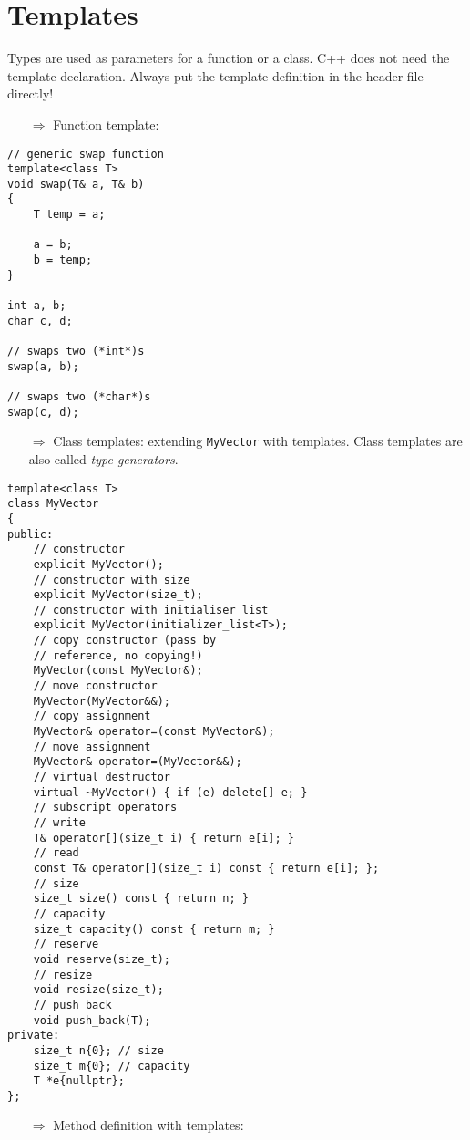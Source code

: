 \documentclass[10pt]{article}
\begin{document}
\section{Templates}
\small
Types are used as parameters for a function or a class.  C++ does not need the template declaration. Always put the 
template definition in the header file directly!
\begin{enumerate}
\item[$\Rightarrow$] Function template:
\end{enumerate}
\begin{lstlisting}
// generic swap function
template<class T>
void swap(T& a, T& b)
{
    T temp = a;
    
    a = b;
    b = temp;
}

int a, b;
char c, d;

// swaps two (*int*)s
swap(a, b);

// swaps two (*char*)s
swap(c, d);
\end{lstlisting}
\begin{enumerate}
\item[$\Rightarrow$] Class templates: extending \texttt{MyVector} with templates. Class templates are also called \emph{type generators}.
\end{enumerate}
\begin{lstlisting}
template<class T>
class MyVector
{
public:
    // constructor
    explicit MyVector();
    // constructor with size
    explicit MyVector(size_t);
    // constructor with initialiser list
    explicit MyVector(initializer_list<T>);
    // copy constructor (pass by
    // reference, no copying!)
    MyVector(const MyVector&);
    // move constructor
    MyVector(MyVector&&);
    // copy assignment
    MyVector& operator=(const MyVector&);
    // move assignment
    MyVector& operator=(MyVector&&);
    // virtual destructor
    virtual ~MyVector() { if (e) delete[] e; }
    // subscript operators
    // write
    T& operator[](size_t i) { return e[i]; }
    // read
    const T& operator[](size_t i) const { return e[i]; };
    // size
    size_t size() const { return n; }
    // capacity
    size_t capacity() const { return m; }
    // reserve
    void reserve(size_t);
    // resize
    void resize(size_t);
    // push back
    void push_back(T);
private:
    size_t n{0}; // size
    size_t m{0}; // capacity
    T *e{nullptr};
};
\end{lstlisting}
\begin{enumerate}
\item[$\Rightarrow$] Method definition with templates:
\end{enumerate}
\end{document}
